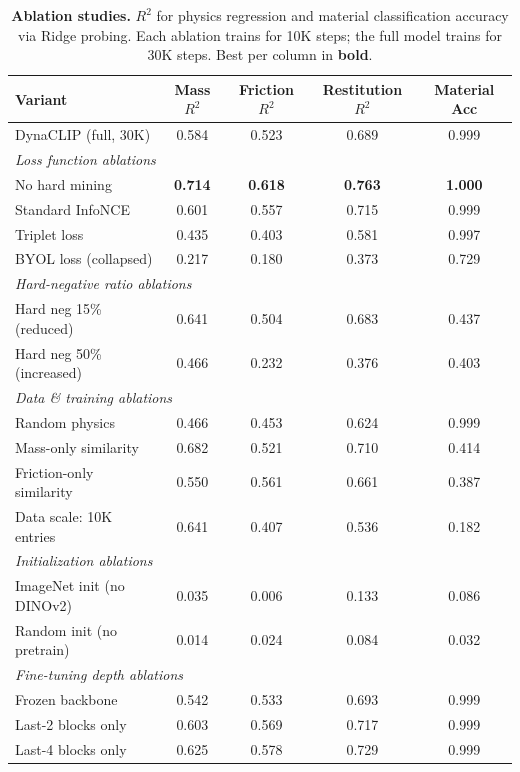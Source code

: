 \documentclass{article}
\newcommand{\methodname}{DynaCLIP}
\begin{document}
\begin{table}[h]
\centering
\caption{\textbf{Ablation studies.} $R^2$ for physics regression and material classification accuracy via Ridge probing. Each ablation trains for 10K steps; the full model trains for 30K steps. Best per column in \textbf{bold}.}
\label{tab:ablations}
\small
\begin{tabular}{lcccc}
\toprule
\textbf{Variant} & \textbf{Mass $R^2$} & \textbf{Friction $R^2$} & \textbf{Restitution $R^2$} & \textbf{Material Acc} \\
\midrule
\methodname{} (full, 30K) & 0.584 & 0.523 & 0.689 & 0.999 \\
\midrule
\multicolumn{5}{l}{\emph{Loss function ablations}} \\
No hard mining              & \textbf{0.714} & \textbf{0.618} & \textbf{0.763} & \textbf{1.000} \\
Standard InfoNCE            & 0.601 & 0.557 & 0.715 & 0.999 \\
Triplet loss                & 0.435 & 0.403 & 0.581 & 0.997 \\
BYOL loss (collapsed)       & 0.217 & 0.180 & 0.373 & 0.729 \\
\midrule
\multicolumn{5}{l}{\emph{Hard-negative ratio ablations}} \\
Hard neg 15\% (reduced)     & 0.641 & 0.504 & 0.683 & 0.437 \\
Hard neg 50\% (increased)   & 0.466 & 0.232 & 0.376 & 0.403 \\
\midrule
\multicolumn{5}{l}{\emph{Data \& training ablations}} \\
Random physics              & 0.466 & 0.453 & 0.624 & 0.999 \\
Mass-only similarity        & 0.682 & 0.521 & 0.710 & 0.414 \\
Friction-only similarity    & 0.550 & 0.561 & 0.661 & 0.387 \\
Data scale: 10K entries     & 0.641 & 0.407 & 0.536 & 0.182 \\
\midrule
\multicolumn{5}{l}{\emph{Initialization ablations}} \\
ImageNet init (no DINOv2)   & 0.035 & 0.006 & 0.133 & 0.086 \\
Random init (no pretrain)   & 0.014 & 0.024 & 0.084 & 0.032 \\
\midrule
\multicolumn{5}{l}{\emph{Fine-tuning depth ablations}} \\
Frozen backbone             & 0.542 & 0.533 & 0.693 & 0.999 \\
Last-2 blocks only          & 0.603 & 0.569 & 0.717 & 0.999 \\
Last-4 blocks only          & 0.625 & 0.578 & 0.729 & 0.999 \\
\bottomrule
\end{tabular}
\end{table}
\end{document}

